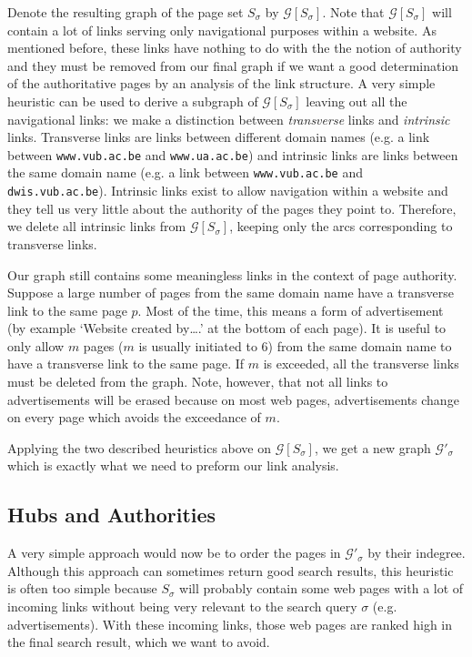 \documentclass[a4paper,11pt]{report}
\newcommand{\graf}{\mathscr{G}}
\begin{document}
Denote the resulting graph of the page set $S_\sigma$ by $\graf[S_\sigma]$. Note that $\graf[S_\sigma]$ will 
contain 
a lot of links serving only navigational purposes within a website. As mentioned 
before, these links have nothing to do with the the notion of authority and they must be 
removed from our final graph if we want a good determination of  the authoritative pages by an analysis of
 the link structure.  A very simple heuristic can be used to derive a subgraph 
 of $\graf[S_\sigma]$ leaving out all the navigational links: we make a 
 distinction between \emph{transverse} links and \emph{intrinsic} links. 
 Transverse links are links between different domain names (e.g. a link between \texttt{www.vub.ac.be} and
 \texttt{www.ua.ac.be}) and intrinsic links are links between the same domain 
 name (e.g. a link between \texttt{www.vub.ac.be} and
 \texttt{dwis.vub.ac.be}). Intrinsic links exist to allow navigation within a 
 website and they tell us very little about the authority of the pages they 
 point to. Therefore, we delete all intrinsic links from  $\graf[S_\sigma]$, 
 keeping only the arcs corresponding to transverse links.
 
Our graph still contains some meaningless links in the context of page 
 authority. Suppose a large number of pages from the same domain name have a transverse link to 
 the same page $p$. Most of the time, this means a form of advertisement (by example `Website created by\ldots.' at the bottom of each page). It is useful 
 to only allow $m$ pages ($m$ is usually initiated to 6) from the same domain name to have a transverse link to the same page. 
 If $m$ is exceeded, all the transverse links must be deleted from the graph. Note, 
 however, that not all links to advertisements will be erased because on most 
 web pages, advertisements change on every page which avoids the exceedance of $m$.
 
 Applying the two described heuristics above on $\graf[S_\sigma]$, we get a new 
 graph $\graf'_\sigma$ which is exactly what we need to preform our link analysis.
 
 \subsection{Hubs and Authorities}
 A very simple approach would now be to order the pages in $\graf'_\sigma$ by 
 their indegree. Although this approach can sometimes return good search results, this
 heuristic is often too simple because $S_\sigma$ will probably contain some 
 web pages with a lot of incoming links without being very relevant to the search query $\sigma$ (e.g. advertisements).   
 With these incoming links, those web pages are ranked high in the final search 
 result, which we want to avoid.
\end{document}
